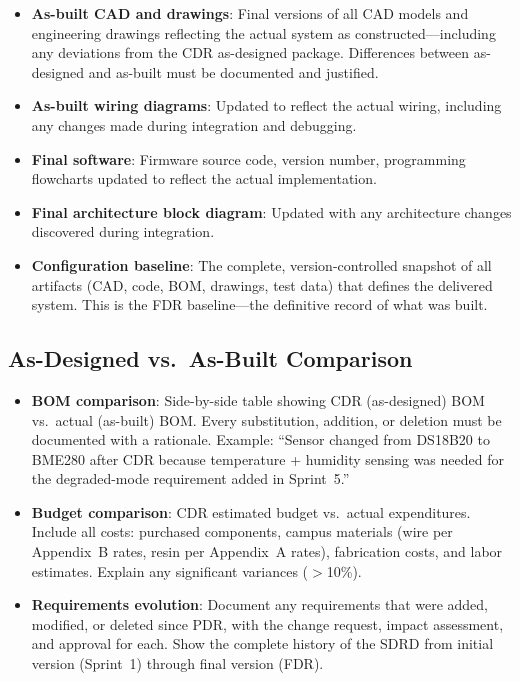 \documentclass[11pt,letterpaper,twoside,openany]{book}
\begin{document}
\begin{itemize}[leftmargin=1.5em]
\item \textbf{As-built CAD and drawings}: Final versions of all CAD models and engineering drawings reflecting the actual system as constructed---including any deviations from the CDR as-designed package. Differences between as-designed and as-built must be documented and justified.
\item \textbf{As-built wiring diagrams}: Updated to reflect the actual wiring, including any changes made during integration and debugging.
\item \textbf{Final software}: Firmware source code, version number, programming flowcharts updated to reflect the actual implementation.
\item \textbf{Final architecture block diagram}: Updated with any architecture changes discovered during integration.
\item \textbf{Configuration baseline}: The complete, version-controlled snapshot of all artifacts (CAD, code, BOM, drawings, test data) that defines the delivered system. This is the FDR baseline---the definitive record of what was built.
\end{itemize}

\subsection{As-Designed vs.\ As-Built Comparison}

\begin{itemize}[leftmargin=1.5em]
\item \textbf{BOM comparison}: Side-by-side table showing CDR (as-designed) BOM vs.\ actual (as-built) BOM. Every substitution, addition, or deletion must be documented with a rationale. Example: ``Sensor changed from DS18B20 to BME280 after CDR because temperature + humidity sensing was needed for the degraded-mode requirement added in Sprint~5.''
\item \textbf{Budget comparison}: CDR estimated budget vs.\ actual expenditures. Include all costs: purchased components, campus materials (wire per Appendix~B rates, resin per Appendix~A rates), fabrication costs, and labor estimates. Explain any significant variances ($>$10\%).
\item \textbf{Requirements evolution}: Document any requirements that were added, modified, or deleted since PDR, with the change request, impact assessment, and approval for each. Show the complete history of the SDRD from initial version (Sprint~1) through final version (FDR).
\end{itemize}
\end{document}
